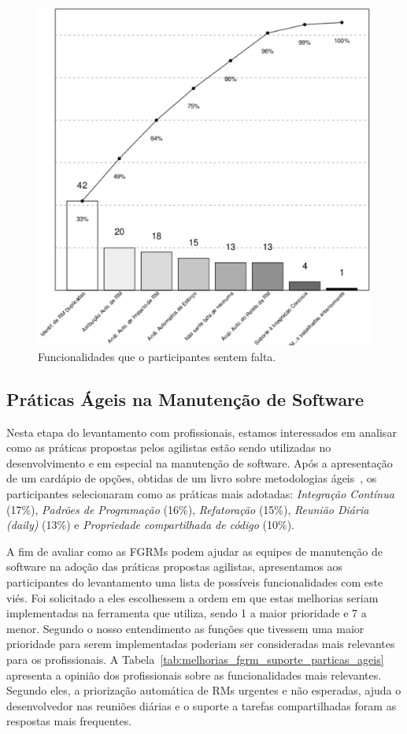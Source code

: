 \begin{figure}[htpb]
	\centering
	\includegraphics[width=0.9\linewidth]{./chapter-pesquisa-com-profissionais/img/grafico_melhorias_fgrm_funcionalidades_faltantes.eps}
	\caption{Funcionalidades que o participantes sentem falta.}\label{fig:grafico_melhorias_fgrm_funcionalidades_falantes}
\end{figure}

\subsection{Práticas Ágeis na Manutenção de Software}\label{sub:práticas_ágeis_na_manutenção_de_software}

Nesta etapa do levantamento com profissionais, estamos interessados em analisar
como as práticas propostas pelos agilistas estão sendo utilizadas no
desenvolvimento e em especial na manutenção de software. Após a apresentação de
um cardápio de opções, obtidas de um livro sobre metodologias
ágeis~\cite{meyer2014agile}, os participantes selecionaram como as práticas
mais adotadas: \textit{Integração Contínua} (17\%), \textit{Padrões de
    Programação} (16\%), \textit{Refatoração} (15\%), \textit{Reunião Diária
    (daily)} (13\%) e \textit{Propriedade compartilhada de código} (10\%).

A fim de avaliar como as FGRMs podem ajudar as equipes de manutenção de
software na adoção das práticas propostas agilistas, apresentamos aos
participantes do levantamento uma lista de possíveis funcionalidades com este
viés. Foi solicitado a eles escolhessem a ordem em que estas melhorias seriam
implementadas na ferramenta que utiliza, sendo 1 a maior prioridade e 7 a
menor. Segundo o nosso entendimento as funções que tivessem uma maior
prioridade para serem implementadas poderiam ser consideradas mais relevantes
para os profissionais. A Tabela~\ref{tab:melhorias_fgrm_suporte_particas_ageis}
apresenta a opinião dos profissionais sobre as funcionalidades mais relevantes.
Segundo eles, a priorização automática de RMs urgentes e não esperadas, ajuda o
desenvolvedor nas reuniões diárias e o suporte a tarefas compartilhadas foram
as respostas mais frequentes.

